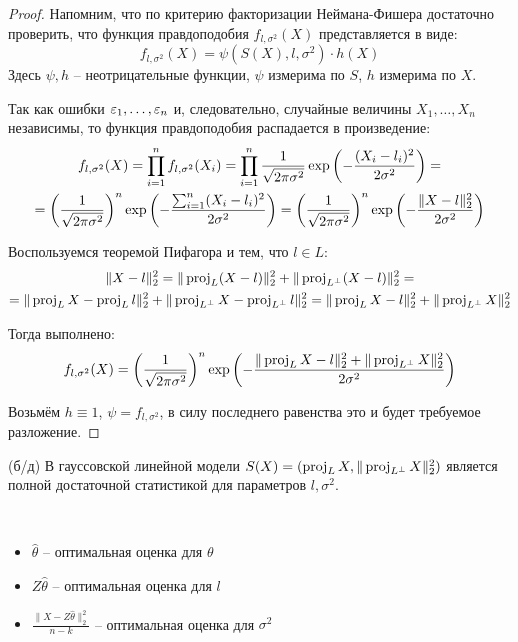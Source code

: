 \begin{proof}
    Напомним, что по критерию факторизации Неймана-Фишера достаточно проверить, что функция правдоподобия $f_{l, \sigma^2}(X)$ представляется в виде:
    \[
        f_{l, \sigma^2}(X) = \psi(S(X), l, \sigma^2) \cdot h(X)
    \]
    Здесь $\psi, h$ -- неотрицательные функции, $\psi$ измерима по $S$, $h$ измерима по $X$.

    Так как ошибки $\varepsilon_1, \dots, \varepsilon_n$ и, следовательно, случайные величины $X_1, \dots, X_n$ независимы, то функция правдоподобия распадается в произведение:
    \begin{multline*}
        f_{l, \sigma^2}(X) = \prod_{i=1}^n f_{l, \sigma^2}(X_i) = \prod_{i=1}^n \frac{1}{\sqrt{2\pi\sigma^2}} \exp \left(-\frac{(X_i - l_i)^2}{2 \sigma^2}\right) =
        \\
        = \left(\frac{1}{\sqrt{2\pi\sigma^2}}\right)^n \exp \left(-\frac{\sum_{i=1}^n (X_i - l_i)^2}{2 \sigma^2}\right) = \left(\frac{1}{\sqrt{2\pi\sigma^2}}\right)^n \exp \left(-\frac{\|X - l\|_2^2}{2 \sigma^2}\right)
    \end{multline*}

    Воспользуемся теоремой Пифагора и тем, что $l \in L$:
    \begin{multline*}
        \|X - l\|_2^2 = \|\operatorname{proj}_L (X-l)\|_2^2 + \|\operatorname{proj}_{L^\perp} (X-l)\|_2^2 =
        \\
        = \|\operatorname{proj}_L X - \operatorname{proj}_L l\|_2^2 + \|\operatorname{proj}_{L^\perp} X - \operatorname{proj}_{L^\perp} l\|_2^2 = \|\operatorname{proj}_L X - l\|_2^2 + \|\operatorname{proj}_{L^\perp} X\|_2^2
    \end{multline*}

    Тогда выполнено:
    \[
        f_{l, \sigma^2}(X) = \left(\frac{1}{\sqrt{2\pi\sigma^2}}\right)^n \exp \left(-\frac{\|\operatorname{proj}_L X - l\|_2^2 + \|\operatorname{proj}_{L^\perp} X\|_2^2}{2 \sigma^2}\right)
    \]

    Возьмём $h \equiv 1$, $\psi = f_{l, \sigma^2}$, в силу последнего равенства это и будет требуемое разложение.
\end{proof}

\begin{theorem} (б/д)
    В гауссовской линейной модели $S(X) = (\operatorname{proj}_L X, \|\operatorname{proj}_{L^\perp} X\|_2^2)$ является полной достаточной статистикой для параметров $l, \sigma^2$.
\end{theorem}

\begin{corollary}~
    \begin{itemize}
        \item $\hat{\theta}$ -- оптимальная оценка для $\theta$
        \item $Z \hat{\theta}$ -- оптимальная оценка для $l$
        \item $\frac{\|X - Z \hat{\theta}\|_2^2}{n-k}$ -- оптимальная оценка для $\sigma^2$
    \end{itemize}
\end{corollary}

